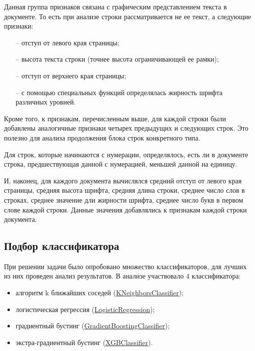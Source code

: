 \documentclass[a4paper,12pt]{article}
\begin{document}
\begin{itemize}
	Данная группа признаков связана с графическим представлением текста в документе. То есть при анализе строки рассматривается не ее текст, а следующие признаки:

	\begin{itemize}

		\item[--] отступ от левого края страницы;
		\item[--] высота текста строки (точнее высота ограничивающей ее рамки);
		\item[--] отступ от верхнего края страницы;
		\item[--] с помощью специальных функций определялась жирность шрифта различных уровней. 

	\end{itemize}

\end{itemize}

Кроме того, к признакам, перечисленным выше, для каждой строки были добавлены аналогичные признаки четырех предыдущих и следующих строк. Это полезно для анализа продолжения блока строк конкретного типа.

Для строк, которые начинаются с нумерации, определялось, есть ли в документе строка, предшествующая данной с нумерацией, меньшей данной на единицу.

И, наконец, для каждого документа вычислялся средний отступ от левого края страницы, средняя высота шрифта, средняя длина строки, среднее число слов в строках, среднее значение дли жирности шрифта, среднее число букв в первом слове каждой строки. Данные значения добавлялись к признакам каждой строки документа.

\subsection{Подбор классификатора}

При решении задачи было опробовано множество классификаторов, для лучших из них проведен анализ результатов. В анализе участвовало 4 классификатора:

\begin{itemize}

	\item алгоритм k ближайших соседей (\href{https://scikit-learn.org/stable/modules/generated/sklearn.neighbors.KNeighborsClassifier.html}{KNeighborsClassifier});
	\item логистическая регрессия (\href{https://scikit-learn.org/stable/modules/generated/sklearn.linear_model.LogisticRegression.html}{LogisticRegression});
	\item градиентный бустинг (\href{https://scikit-learn.org/stable/modules/generated/sklearn.ensemble.GradientBoostingClassifier.html}{GradientBoostingClassifier});
	\item экстра-градиентный бустинг (\href{https://xgboost.readthedocs.io/en/latest/}{XGBClassifier}).

\end{itemize}
\end{document}
